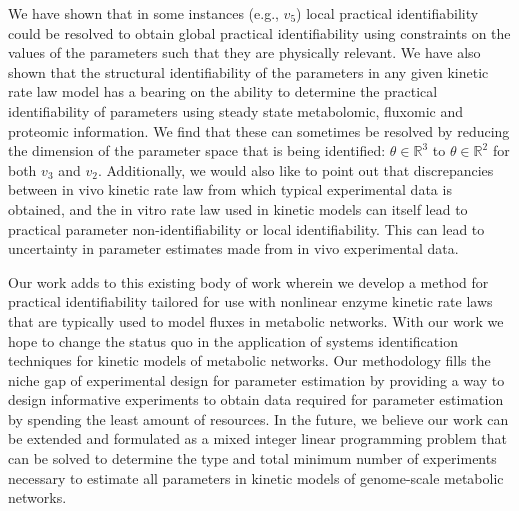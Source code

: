 \documentclass[10pt]{article}
\begin{document}
	We have shown that in some instances (e.g., $v_5$) local practical identifiability could be resolved to obtain global practical identifiability using constraints on the values of the parameters such that they are physically relevant. We have also shown that the structural identifiability of the parameters in any given kinetic rate law model has a bearing on the ability to determine the practical identifiability of parameters using steady state metabolomic, fluxomic and proteomic information. We find that these can sometimes be resolved by reducing the dimension of the parameter space that is being identified: $\theta \in \mathbb{R}^3$ to $\theta \in \mathbb{R}^2$ for both $v_3$ and $v_2$. Additionally, we would also like to point out that discrepancies between in vivo kinetic rate law from which typical experimental data is obtained, and the in vitro rate law used in kinetic models can itself lead to practical parameter non-identifiability or local identifiability. This can lead to uncertainty in parameter estimates made from in vivo experimental data.
	
	Our work adds to this existing body of work wherein we develop a method for practical identifiability tailored for use with nonlinear enzyme kinetic rate laws that are typically used to model fluxes in metabolic networks. With our work we hope to change the status quo in the application of systems identification techniques for kinetic models of metabolic networks. Our methodology fills the niche gap of experimental design for parameter estimation by providing a way to design informative experiments to obtain data required for parameter estimation by spending the least amount of resources.	
	In the future, we believe our work can be extended and formulated as a mixed integer linear programming problem that can be solved to determine the type and total minimum number of experiments necessary to estimate all parameters in kinetic models of genome-scale metabolic networks.
	
	
\end{document}
